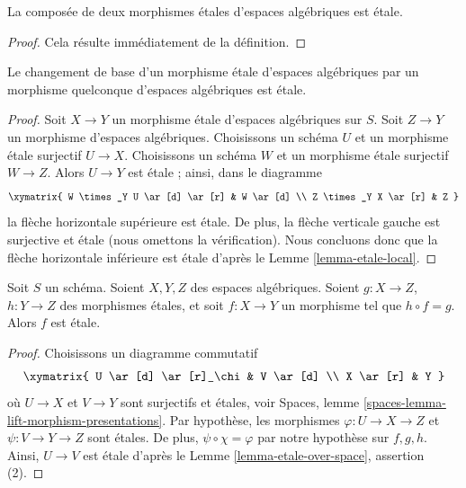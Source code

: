 \begin{lemma}
\label{lemma-composition-etale}
La composée de deux morphismes \'etales d'espaces algébriques
est \'etale.
\end{lemma}

\begin{proof}
Cela résulte immédiatement de la définition.
\end{proof}

\begin{lemma}
\label{lemma-base-change-etale}
Le changement de base d'un morphisme \'etale d'espaces algébriques
par un morphisme quelconque d'espaces algébriques est \'etale.
\end{lemma}

\begin{proof}
Soit $X \to Y$ un morphisme \'etale d'espaces algébriques sur $S$.
Soit $Z \to Y$ un morphisme d'espaces algébriques.
Choisissons un schéma $U$ et un morphisme \'etale surjectif $U \to X$.
Choisissons un schéma $W$ et un morphisme \'etale surjectif $W \to Z$.
Alors $U \to Y$ est \'etale ; ainsi, dans le diagramme
$$
\xymatrix{
W \times_Y U \ar[d] \ar[r] & W \ar[d] \\
Z \times_Y X \ar[r] & Z
}
$$
la flèche horizontale supérieure est \'etale.
De plus, la flèche verticale gauche est surjective
et \'etale (nous omettons la vérification). Nous concluons donc que la flèche
horizontale inférieure est \'etale d'après le Lemme \ref{lemma-etale-local}.
\end{proof}

\begin{lemma}
\label{lemma-etale-permanence}
Soit $S$ un schéma. Soient $X, Y, Z$ des espaces algébriques.
Soient $g : X \to Z$, $h : Y \to Z$ des morphismes \'etales, et soit
$f : X \to Y$ un morphisme tel que $h \circ f = g$.
Alors $f$ est \'etale.
\end{lemma}

\begin{proof}
Choisissons un diagramme commutatif
$$
\xymatrix{
U \ar[d] \ar[r]_\chi & V \ar[d] \\
X \ar[r] & Y
}
$$
où $U \to X$ et $V \to Y$ sont surjectifs et \'etales, voir
Spaces, lemme \ref{spaces-lemma-lift-morphism-presentations}.
Par hypothèse, les morphismes $\varphi : U \to X \to Z$ et
$\psi : V \to Y \to Z$ sont \'etales. De plus, $\psi \circ \chi = \varphi$
par notre hypothèse sur $f, g, h$.
Ainsi, $U \to V$ est \'etale d'après le Lemme \ref{lemma-etale-over-space},
assertion (2).
\end{proof}

